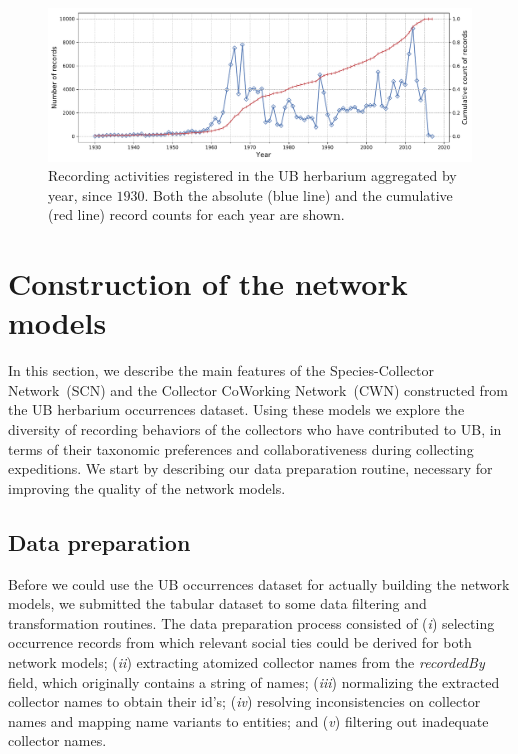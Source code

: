\begin{figure}[h!]
\centering
\includegraphics[width=\linewidth]{figures/casestudy_ub/ub_records_timeseries.pdf}
\caption[Recording activities registered in the UB herbarium aggregated by year, since $1930$]{Recording activities registered in the UB herbarium aggregated by year, since $1930$. Both the absolute (blue line) and the cumulative (red line) record counts for each year are shown.}
\label{fig:ub_records_timeseries}
\end{figure}




\section{Construction of the network models}

In this section, we describe the main features of the Species-Collector Network~(SCN) and the Collector CoWorking Network~(CWN) constructed from the UB herbarium occurrences dataset.
Using these models we explore the diversity of recording behaviors of the collectors who have contributed to UB, in terms of their taxonomic preferences and collaborativeness during collecting expeditions.
We start by describing our data preparation routine, necessary for improving the quality of the network models.

\subsection{Data preparation} \label{section:ub_data_preparation}
Before we could use the UB occurrences dataset for actually building the network models, we submitted the tabular dataset to some data filtering and transformation routines.
The data preparation process consisted of 
(\textit{i}) selecting occurrence records from which relevant social ties could be derived for both network models; 
(\textit{ii}) extracting atomized collector names from the \textit{recordedBy} field, which originally contains a string of names;
(\textit{iii}) normalizing the extracted collector names to obtain their id's;
(\textit{iv}) resolving inconsistencies on collector names and mapping name variants to entities; and
(\textit{v}) filtering out inadequate collector names. %

